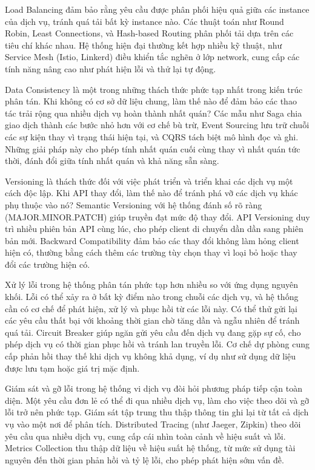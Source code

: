 Load Balancing đảm bảo rằng yêu cầu được phân phối hiệu quả giữa các instance của dịch vụ, tránh quá tải bất kỳ instance nào. Các thuật toán như Round Robin, Least Connections, và Hash-based Routing phân phối tải dựa trên các tiêu chí khác nhau. Hệ thống hiện đại thường kết hợp nhiều kỹ thuật, như Service Mesh (Istio, Linkerd) điều khiển tắc nghẽn ở lớp network, cung cấp các tính năng nâng cao như phát hiện lỗi và thử lại tự động.

Data Consistency là một trong những thách thức phức tạp nhất trong kiến trúc phân tán. Khi không có cơ sở dữ liệu chung, làm thế nào để đảm bảo các thao tác trải rộng qua nhiều dịch vụ hoàn thành nhất quán? Các mẫu như Saga chia giao dịch thành các bước nhỏ hơn với cơ chế bù trừ, Event Sourcing lưu trữ chuỗi các sự kiện thay vì trạng thái hiện tại, và CQRS tách biệt mô hình đọc và ghi. Những giải pháp này cho phép tính nhất quán cuối cùng thay vì nhất quán tức thời, đánh đổi giữa tính nhất quán và khả năng sẵn sàng.

Versioning là thách thức đối với việc phát triển và triển khai các dịch vụ một cách độc lập. Khi API thay đổi, làm thế nào để tránh phá vỡ các dịch vụ khác phụ thuộc vào nó? Semantic Versioning với hệ thống đánh số rõ ràng (MAJOR.MINOR.PATCH) giúp truyền đạt mức độ thay đổi. API Versioning duy trì nhiều phiên bản API cùng lúc, cho phép client di chuyển dần dần sang phiên bản mới. Backward Compatibility đảm bảo các thay đổi không làm hỏng client hiện có, thường bằng cách thêm các trường tùy chọn thay vì loại bỏ hoặc thay đổi các trường hiện có.

Xử lý lỗi trong hệ thống phân tán phức tạp hơn nhiều so với ứng dụng nguyên khối. Lỗi có thể xảy ra ở bất kỳ điểm nào trong chuỗi các dịch vụ, và hệ thống cần có cơ chế để phát hiện, xử lý và phục hồi từ các lỗi này. Có thể thử gửi lại các yêu cầu thất bại với khoảng thời gian chờ tăng dần và ngẫu nhiên để tránh quá tải. Circuit Breaker giúp ngăn gửi yêu cầu đến dịch vụ đang gặp sự cố, cho phép dịch vụ có thời gian phục hồi và tránh lan truyền lỗi. Cơ chế dự phòng cung cấp phản hồi thay thế khi dịch vụ không khả dụng, ví dụ như sử dụng dữ liệu được lưu tạm hoặc giá trị mặc định.

Giám sát và gỡ lỗi trong hệ thống vi dịch vụ đòi hỏi phương pháp tiếp cận toàn diện. Một yêu cầu đơn lẻ có thể đi qua nhiều dịch vụ, làm cho việc theo dõi và gỡ lỗi trở nên phức tạp. Giám sát tập trung thu thập thông tin ghi lại từ tất cả dịch vụ vào một nơi để phân tích. Distributed Tracing (như Jaeger, Zipkin) theo dõi yêu cầu qua nhiều dịch vụ, cung cấp cái nhìn toàn cảnh về hiệu suất và lỗi. Metrics Collection thu thập dữ liệu về hiệu suất hệ thống, từ mức sử dụng tài nguyên đến thời gian phản hồi và tỷ lệ lỗi, cho phép phát hiện sớm vấn đề.

